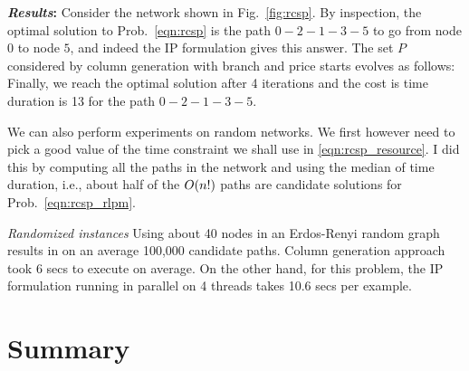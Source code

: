 \documentclass[letterpaper, 10pt, twocolumn, reqno]{amsart}
\begin{document}
\textbf{\emph{Results}:} Consider the network shown in Fig.~\ref{fig:rcsp}. By inspection, the optimal solution to Prob.~\eqref{eqn:rcsp} is the path $0-2-1-3-5$ to go from node $0$ to node $5$, and indeed the IP formulation gives this answer. The set $P$ considered by column generation with branch and price starts evolves as follows:
Finally, we reach the optimal solution after 4 iterations and the cost is time duration is 13 for the path $0-2-1-3-5$.

We can also perform experiments on random networks. We first however need to pick a good value of the time constraint we shall use in \eqref{eqn:rcsp_resource}. I did this by computing all the paths in the network and using the median of time duration, i.e., about half of the $O(n!)$ paths are candidate solutions for Prob.~\ref{eqn:rcsp_rlpm}.

\emph{Randomized instances} Using about 40 nodes in an Erdos-Renyi random graph results in on an average 100,000 candidate paths. Column generation approach took 6 secs to execute on average. On the other hand, for this problem, the IP formulation running in parallel on 4 threads takes 10.6 secs per example.


\section{Summary}
\label{sec:summary}


{
\footnotesize


}
\end{document}
